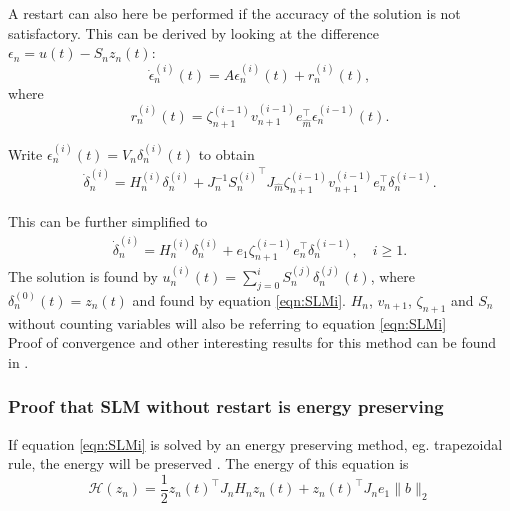 A restart can also here be performed if the accuracy of the solution is not satisfactory. This can be derived by looking at the difference $ \epsilon_n = u(t) - S_n z_n(t)$: %
\begin{equation}
\dot{\epsilon}_n^{(i)}(t) = A \epsilon_n^{(i)}(t) + r_n^{(i)}(t),
\label{eqn:resenerg}
\end{equation}
where
\begin{equation*}
r_n^{(i)}(t) = \zeta_{n+1}^{(i-1)} v_{n+1}^{(i-1)} e_{\hat{m}}^\top \epsilon_n^{(i-1)}(t).
\end{equation*}

Write $ \epsilon^{(i)}_n(t)  = V_n \delta_n^{(i)}(t) $ to obtain
\begin{equation*}
\begin{aligned}
\dot{\delta}_n^{(i)} = H_n^{(i)} \delta_n^{(i)} + J^{-1}_n {S_n^{(i)}}^\top J_{\hat{m}} \zeta_{n+1}^{(i-1)}v_{n+1}^{(i-1)} e_n^\top \delta_n^{(i-1)}.
\end{aligned}
\end{equation*}

This can be further simplified to
\begin{equation}
\begin{aligned}
\dot{\delta}_n^{(i)} = H_n^{(i)} \delta_n^{(i)} + e_1 \zeta_{n+1}^{(i-1)} e_n^\top \delta_n^{(i-1)}, \quad i \geq 1.
\label{eqn:SLMr}
\end{aligned}
\end{equation}
The solution is found by $ u_n^{(i)}(t) = \sum \limits_{j = 0} ^i S_n^{(j)} \delta_n^{(j)} (t) $, where $\delta_n^{(0)} (t) = z_n(t)$ and found by equation \eqref{eqn:SLMi}. $H_n$, $v_{n+1}$, $\zeta_{n+1}$ and $S_n$ without counting variables will also be referring to equation \eqref{eqn:SLMi} \\

Proof of convergence and other interesting results for this method can be found in \cite{SLMinteresting}. 

\subsubsection{Proof that SLM without restart is energy preserving} %
If equation \eqref{eqn:SLMi} is solved by an energy preserving method, eg. trapezoidal rule, the energy will be preserved \cite{SLMpreserve}. The energy of this equation is
\begin{equation*}
\mathcal{H}(z_n) = \frac{1}{2}z_n(t)^\top J_n H_n z_n(t) + z_n(t)^\top J_n e_1 \|b \|_2
\end{equation*}

